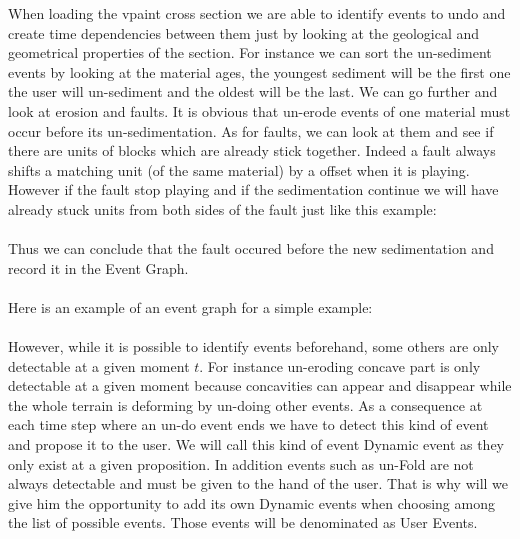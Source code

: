 \documentclass[12pt, a4paper]{report} %
\begin{document}
When loading the vpaint cross section we are able to identify events to undo  and create time dependencies between them just by looking at the geological and geometrical properties of the section. For instance we can sort the un-sediment events by looking at the material ages, the youngest sediment will be the first one the user will un-sediment and the oldest will be the last. We can go further and look at erosion and faults. It is obvious that un-erode events of one material must occur before its un-sedimentation. As for faults, we can look at them and see if there are units of blocks which are already stick together. Indeed a fault always shifts a matching unit (of the same material) by a offset when it is playing. However if the fault stop playing and if the sedimentation continue we will have already stuck units from both sides of the fault just like this example:\\\\

Thus we can conclude that the fault occured before the new sedimentation and record it in the Event Graph.\\\\

Here is an example of an event graph for a simple example:\\\\

However, while it is possible to identify events beforehand, some others are only detectable at a given moment $t$. For instance un-eroding concave part is only detectable at a given moment because concavities can appear and disappear while the whole terrain is deforming by un-doing other events. As a consequence at each time step where an un-do event ends we have to detect this kind of event and propose it to the user. We will call this kind of event Dynamic event as they only exist at a given proposition. In addition events such as un-Fold are not always detectable and must be given to the hand of the user. That is why will we give him the opportunity to add its own Dynamic events when choosing among the list of possible events. Those events will be denominated as User Events.\\\\
\end{document}
